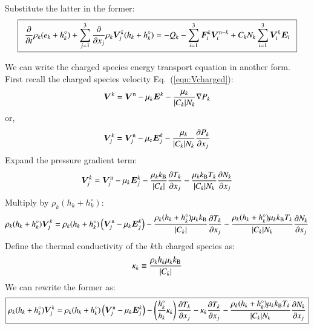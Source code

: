 \documentclass{warpdoc}
\newcommand\frameeqn[1]{\fbox{$\displaystyle #1$}}
\newcommand{\mfd}{\displaystyle}
\renewcommand{\vec}[1]{\bm{#1}}
\begin{document}
%
Substitute the latter in the former:
%
\begin{equation}
\frameeqn{
\begin{array}{l}\mfd
 \frac{\partial }{\partial t}\rho_k (e_k+h_k^\circ) + \sum_{j=1}^3  \frac{\partial }{\partial x_j} \rho_k \vec{V}^k_j (h_k+h_k^\circ) 
= 
- Q_{k}
-\sum_{i=1}^3 \vec{F}_i^k \vec{V}_i^{{\rm n}-k} 
+ C_k N_k \sum_{i=1}^3 \vec{V}^k_i \vec{E}_i
\end{array}
}
\label{eqn:echarged5}
\end{equation}
%  

We can write the charged species energy transport equation in another form. First recall the charged species velocity Eq.\ (\ref{eqn:Vcharged}):
%
\begin{equation}
  \vec{V}^{k}=\vec{V}^{\rm n} - \mu_{k} \vec{E}^{k} -\frac{\mu_{k}}{|C_{k}| N_{k}}\nabla P_{k}
\end{equation}
% 
or,
%
\begin{equation}
  \vec{V}^{k}_j=\vec{V}^{\rm n}_j - \mu_{\rm e} \vec{E}^{k}_j -\frac{\mu_{k}}{|C_{k}| N_{k}} \frac{\partial P_{k}}{\partial x_j} 
\end{equation}
% 
Expand the pressure gradient term:
%
\begin{equation}
  \vec{V}^{k}_j=\vec{V}^{\rm n}_j - \mu_{k} \vec{E}^{k}_j 
    -\frac{\mu_{k} k_{\rm B}}{|C_{k}| } \frac{  \partial T_{k}}{\partial x_j} 
    -\frac{\mu_{k} k_{\rm B} T_{k}}{|C_{k}| N_{k}} \frac{\partial N_{k}  }{\partial x_j} 
\end{equation}
% 
Multiply by $\rho_{k} (h_{k}+h_k^\circ)$:
%
\begin{equation}
  \rho_{k} (h_{k}+h_k^\circ) \vec{V}^{k}_j
  = \rho_{k} (h_{k}+h_k^\circ)\left( \vec{V}^{\rm n}_j 
  - \mu_{k} \vec{E}^{k}_j \right)
  -\frac{\rho_{k} (h_{k}+h_k^\circ) \mu_{k} k_{\rm B}}{|C_{k}| } \frac{  \partial T_{k}}{\partial x_j} 
  -\frac{\rho_{k} (h_{k}+h_k^\circ) \mu_{k} k_{\rm B} T_{k}}{|C_{k}| N_{k}} \frac{\partial N_{k}  }{\partial x_j} 
\end{equation}
%
Define the thermal conductivity of the $k$th charged species as:
%
\begin{equation}
\kappa_k \equiv \frac{\rho_{k} {h}_{k} \mu_{k} k_{\rm B}}{|C_{k}| }
\end{equation}
%
We can rewrite the former as:
%
\begin{equation}
\frameeqn{
  \rho_{k} (h_{k}+h_k^\circ) \vec{V}^{k}_j
  = \rho_{k} (h_{k}+h_k^\circ)\left( \vec{V}^{\rm n}_j 
  - \mu_{k} \vec{E}^{k}_j \right)
  -\left( \frac{ h_k^\circ }{h_k }\kappa_k \right)\frac{  \partial T_{k}}{\partial x_j} 
  -\kappa_k \frac{  \partial T_{k}}{\partial x_j} 
  -\frac{\rho_{k} (h_{k}+h_k^\circ) \mu_{k} k_{\rm B} T_{k}}{|C_{k}| N_{k}} \frac{\partial N_{k}  }{\partial x_j} 
}
\end{equation}
%
\end{document}
